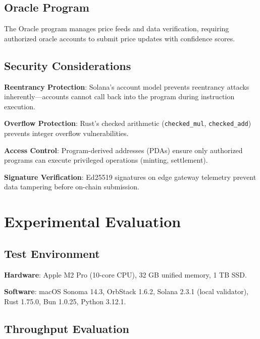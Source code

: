 \documentclass[conference]{IEEEtran}
\begin{document}
\subsection{Oracle Program}

The Oracle program manages price feeds and data verification, requiring authorized oracle accounts to submit price updates with confidence scores.

\subsection{Security Considerations}

\textbf{Reentrancy Protection}: Solana's account model prevents reentrancy attacks inherently---accounts cannot call back into the program during instruction execution.

\textbf{Overflow Protection}: Rust's checked arithmetic (\texttt{checked\_mul}, \texttt{checked\_add}) prevents integer overflow vulnerabilities.

\textbf{Access Control}: Program-derived addresses (PDAs) ensure only authorized programs can execute privileged operations (minting, settlement).

\textbf{Signature Verification}: Ed25519 signatures on edge gateway telemetry prevent data tampering before on-chain submission.

\section{Experimental Evaluation}

\subsection{Test Environment}

\textbf{Hardware}: Apple M2 Pro (10-core CPU), 32 GB unified memory, 1 TB SSD.

\textbf{Software}: macOS Sonoma 14.3, OrbStack 1.6.2, Solana 2.3.1 (local validator), Rust 1.75.0, Bun 1.0.25, Python 3.12.1.

\subsection{Throughput Evaluation}
\end{document}
